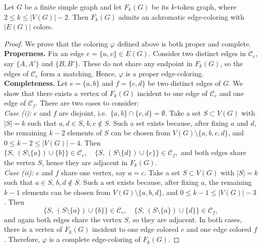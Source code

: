 \documentclass[10pt,a4paper]{amsart}
\begin{document}
\begin{proposition}
Let $G$ be a finite simple graph and let $F_k(G)$ be its $k$-token graph, where $2 \le k \le |V(G)| - 2$. Then $F_k(G)$ admits an achromatic edge-coloring with $|E(G)|$ colors.\end{proposition}

\begin{proof}
We prove that the coloring $\varphi$ defined above is both proper and complete.\\
\textbf{Properness.} Fix an edge $e=\{u,v\}\in E(G)$. 
Consider two distinct edges in $\mathcal{C}_e$, say $\{A,A'\}$ and $\{B,B'\}$. 
These do not share any endpoint in $F_k(G)$, so the edges of $\mathcal{C}_e$ form a matching. 
Hence, $\varphi$ is a proper edge-coloring. \\
\textbf{Completeness.} 
Let $e=\{a,b\}$ and $f=\{c,d\}$ be two distinct edges of $G$. 
We show that there exists a vertex of $F_k(G)$ incident to one edge of $\mathcal{C}_e$ and one edge of $\mathcal{C}_f$. 
There are two cases to consider:\\
\emph{Case (i):} $e$ and $f$ are disjoint, i.e.\ $\{a,b\} \cap \{c,d\} = \emptyset$.  
Take a set $S \subset V(G)$ with $|S|=k$ such that $a,d \in S$, $b,c \notin S$.  
Such a set exists because, after fixing $a$ and $d$, the remaining
$k-2$ elements of $S$ can be chosen from
$V(G)\setminus\{a,b,c,d\}$, and
$0\leq k-2\leq |V(G)|-4$.
Then $\{S,\, (S\setminus\{a\}) \cup \{b\}\} \in \mathcal{C}_e, 
\quad 
\{S,\, (S\setminus\{d\}) \cup \{c\}\} \in \mathcal{C}_f,$
and both edges share the vertex $S$, hence they are adjacent in $F_k(G)$. \\
\emph{Case (ii):} $e$ and $f$ share one vertex, say $a=c$.  
Take a set $S \subset V(G)$ with $|S|=k$ such that $a \in S$, $b,d \notin S$.  
Such a set exists because, after fixing $a$, the remaining $k-1$
elements can be chosen from $V(G)\setminus\{a,b,d\}$, and
$0\leq k-1\leq |V(G)|-3$.
Then
$$
\{S,\, (S\setminus\{a\}) \cup \{b\}\} \in \mathcal{C}_e, 
\quad 
\{S,\, (S\setminus\{a\}) \cup \{d\}\} \in \mathcal{C}_f,
$$
and again both edges share the vertex $S$, so they are adjacent.
In both cases, there is a vertex of $F_k(G)$ incident to one edge colored $e$ and one edge colored $f$. 
Therefore, $\varphi$ is a complete edge-coloring of $F_k(G)$.
\end{proof}
\end{document}
